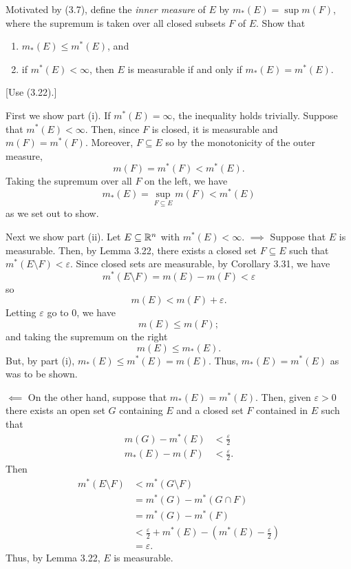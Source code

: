 \begin{problem}
  Motivated by (3.7), define the \emph{inner measure} of \(E\) by
  \(m_*(E)=\sup m(F)\), where the supremum is taken over all closed subsets
  \(F\) of \(E\). Show that
  \begin{enumerate}[label=(\roman*),noitemsep]
  \item \(m_*(E)\leq m^*(E)\), and
  \item if \(m^*(E)<\infty\), then \(E\) is measurable if and only if
    \(m_*(E)=m^*(E)\).
  \end{enumerate} [Use (3.22).]
\end{problem}
\begin{solution}
  First we show part (i). If \(m^*(E)=\infty\), the inequality holds
  trivially. Suppose that \(m^*(E)<\infty\). Then, since \(F\) is closed,
  it is measurable and \(m(F)=m^*(F)\). Moreover, \(F\subseteq E\) so by
  the monotonicity of the outer measure,
  \[
    m(F)=m^*(F)<m^*(E).
  \]
  Taking the supremum over all \(F\) on the left, we have
  \[
    m_*(E)=\sup_{F\subseteq E}m(F)<m^*(E)
  \]
  as we set out to show.

  Next we show part (ii). Let \(E\subseteq\mathbb{R}^n\) with
  \(m^*(E)<\infty\). \(\implies\) Suppose that \(E\) is measurable. Then,
  by Lemma 3.22, there exists a closed set \(F\subseteq E\) such that
  \(m^*(E\setminus F)<\varepsilon\). Since closed sets are measurable, by
  Corollary 3.31, we have
  \[
    m^*(E\setminus F)=m(E)-m(F)<\varepsilon
  \]
  so
  \[
    m(E)<m(F)+\varepsilon.
  \]
  Letting \(\varepsilon\) go to \(0\), we have
  \[
    m(E)\leq m(F);
  \]
  and taking the supremum on the right
  \[
    m(E)\leq m_*(E).
  \]
  But, by part (i), \(m_*(E)\leq m^*(E)=m(E)\). Thus, \(m_*(E)=m^*(E)\) as
  was to be shown.

  \(\impliedby\) On the other hand, suppose that \(m_*(E)=m^*(E)\). Then,
  given \(\varepsilon>0\) there exists an open set \(G\) containing \(E\)
  and a closed set \(F\) contained in \(E\) such that
  \begin{align*}
    m(G)-m^*(E)&<\frac{\varepsilon}{2}\\
    m_*(E)-m(F)&<\frac{\varepsilon}{2}.
  \end{align*}
  Then
  \begin{align*}
    m^*(E\setminus F)
    &<m^*(G\setminus F)\\
    &=m^*(G)-m^*(G\cap F)\\
    &=m^*(G)-m^*(F)\\
    &<\frac{\varepsilon}{2}+m^*(E)-\left(m^*(E)-\frac{\varepsilon}{2}\right)\\
    &=\varepsilon.
  \end{align*}
  Thus, by Lemma 3.22, \(E\) is measurable.
\end{solution}

